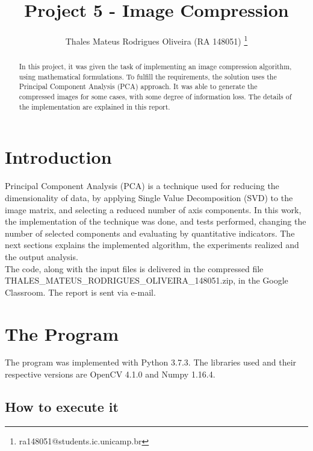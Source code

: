 \documentclass[]{IEEEtran}
\begin{document}
  \title{Project 5 - Image Compression}
  \author{Thales Mateus Rodrigues Oliveira (RA 148051)
    \thanks{ra148051@students.ic.unicamp.br}
  }
  \maketitle
  
  \begin{abstract}
    In this project, it was given the task of implementing an image compression algorithm, using mathematical formulations. To fulfill the requirements, the solution uses the Principal Component Analysis (PCA) approach. It was able to generate the compressed images for some cases, with some degree of information loss. The details of the implementation are explained in this report.
  \end{abstract}
  
\section{Introduction}

Principal Component Analysis (PCA) is a technique used for reducing the dimensionality of data, by applying Single Value Decomposition (SVD) to the image matrix, and selecting a reduced number of axis components. In this work, the implementation of the technique was done, and tests performed, changing the number of selected components and evaluating by quantitative indicators. The next sections explains the implemented algorithm, the experiments realized and the output analysis.
\\
The code, along with the input files is delivered in the compressed file THALES\_MATEUS\_RODRIGUES\_OLIVEIRA\_148051.zip, in the Google Classroom. The report is sent via e-mail.
\section{The Program}
 
The program was implemented with Python 3.7.3. The libraries used and their respective versions are OpenCV 4.1.0 and Numpy 1.16.4.

\subsection{How to execute it}
\end{document}
